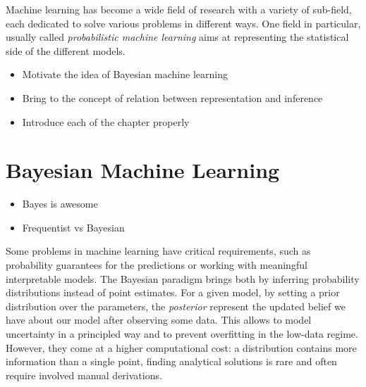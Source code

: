 
\ifpdf
    \graphicspath{{1_introduction/figures/PNG/}{1_introduction/figures/PDF/}{1_introduction/figures/}}
\else
    \graphicspath{{1_introduction/figures/EPS/}{1_introduction/figures/}}
\fi


Machine learning has become a wide field of research with a variety of sub-field, each dedicated to solve various problems in different ways.
One field in particular, usually called \textit{probabilistic machine learning} aims at representing the statistical side of the different models.

\begin{itemize}
    \item Motivate the idea of Bayesian machine learning
    \item Bring to the concept of relation between representation and inference
    \item Introduce each of the chapter properly
\end{itemize}


\section{Bayesian Machine Learning}

\begin{itemize}
    \item Bayes is awesome
    \item Frequentist vs Bayesian
\end{itemize}

Some problems in machine learning have critical requirements, such as probability guarantees for the predictions or working with meaningful interpretable models.
The Bayesian paradigm brings both by inferring probability distributions instead of point estimates.
For a given model, by setting a prior distribution over the parameters, the \textit{posterior} represent the updated belief we have about our model after observing some data.
This allows to model uncertainty in a principled way and to prevent overfitting in the low-data regime.
However, they come at a higher computational cost: a distribution contains more information than a single point, finding analytical solutions is rare and often require involved manual derivations.

